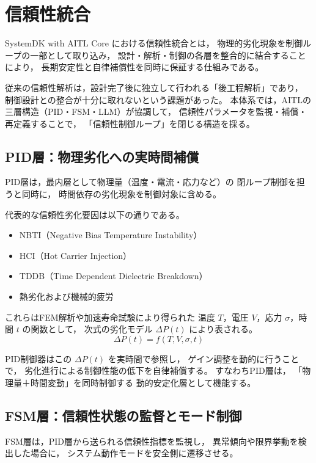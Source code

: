 \section{信頼性統合}

SystemDK with AITL Core における信頼性統合とは，
物理的劣化現象を制御ループの一部として取り込み，
設計・解析・制御の各層を整合的に結合することにより，
長期安定性と自律補償性を同時に保証する仕組みである。

従来の信頼性解析は，設計完了後に独立して行われる「後工程解析」であり，
制御設計との整合が十分に取れないという課題があった。
本体系では，AITLの三層構造（PID・FSM・LLM）が協調して，
信頼性パラメータを監視・補償・再定義することで，
「信頼性制御ループ」を閉じる構造を採る。

\subsection{PID層：物理劣化への実時間補償}
PID層は，最内層として物理量（温度・電流・応力など）の
閉ループ制御を担うと同時に，
時間依存の劣化現象を制御対象に含める。

代表的な信頼性劣化要因は以下の通りである。
\begin{itemize}
  \item NBTI（Negative Bias Temperature Instability）
  \item HCI（Hot Carrier Injection）
  \item TDDB（Time Dependent Dielectric Breakdown）
  \item 熱劣化および機械的疲労
\end{itemize}

これらはFEM解析や加速寿命試験により得られた
温度 $T$，電圧 $V$，応力 $\sigma$，時間 $t$ の関数として，
次式の劣化モデル $\Delta P(t)$ により表される。
\begin{equation}
\Delta P(t) = f(T, V, \sigma, t)
\end{equation}

PID制御器はこの $\Delta P(t)$ を実時間で参照し，
ゲイン調整を動的に行うことで，
劣化進行による制御性能の低下を自律補償する。
すなわちPID層は，
「物理量＋時間変動」を同時制御する
動的安定化層として機能する。

\subsection{FSM層：信頼性状態の監督とモード制御}
FSM層は，PID層から送られる信頼性指標を監視し，
異常傾向や限界挙動を検出した場合に，
システム動作モードを安全側に遷移させる。

